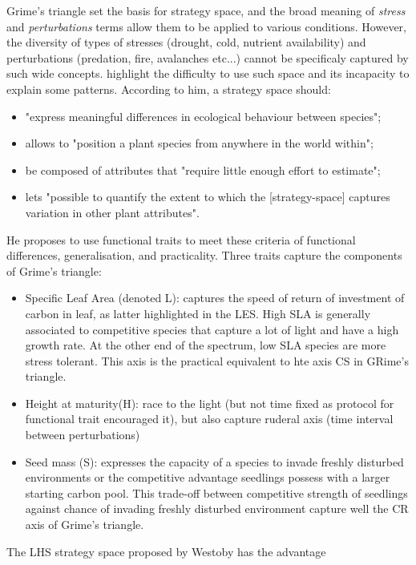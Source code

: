 Grime's triangle set the basis for strategy space, and the broad meaning of \textit{stress} and \textit{perturbations} terms allow them to be applied to various conditions. However, the diversity of types of stresses (drought, cold, nutrient availability) and perturbations (predation, fire, avalanches etc...) cannot be specificaly captured by such wide concepts. \cite{westoby_leaf-height-seed_1998} highlight the difficulty to use such space and its incapacity to explain some patterns. According to him, a strategy space should: 
\begin{itemize}
\item "express meaningful differences in ecological behaviour between species";
\item allows to "position a plant species from anywhere in the world within";
\item be composed of attributes that "require little enough effort to estimate";
\item lets "possible to quantify the extent to which the [strategy-space] captures variation in other plant attributes".
\end{itemize}
He proposes to use functional traits to meet these criteria of functional differences, generalisation, and practicality. Three traits capture the components of Grime's triangle:
\begin{itemize}
\item Specific Leaf Area (denoted L): captures the speed of return of investment of carbon in leaf, as latter highlighted in the LES. High SLA is generally associated to competitive species that capture a lot of light and have a high growth rate. At the other end of the spectrum, low SLA species are more stress tolerant. This axis is the practical equivalent to hte axis CS in GRime's triangle.
\item Height at maturity(H): race to the light (but not time fixed as protocol for functional trait encouraged it), but also capture ruderal axis (time interval between perturbations)
\item Seed mass (S): expresses the capacity of a species to invade freshly disturbed environments or the competitive advantage seedlings possess with a larger starting carbon pool. This trade-off between competitive strength of seedlings against chance of invading freshly disturbed environment capture well the CR axis of Grime's triangle.
\end{itemize}
The LHS strategy space proposed by Westoby has the advantage 


